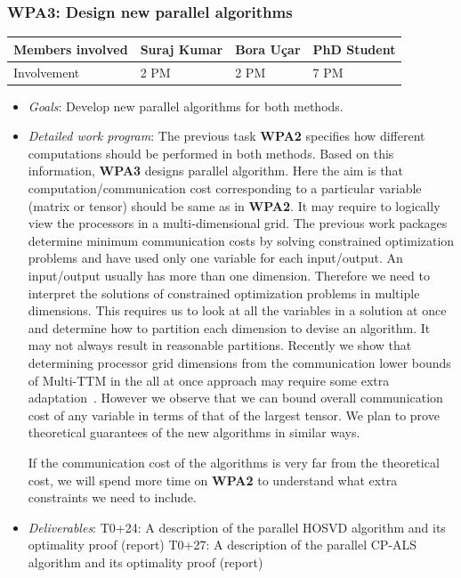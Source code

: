 \documentclass[a4paper,11pt]{article}
\newcommand{\subtask}[1]{{\color{orange}\paragraph{#1}$ $}}
\newcommand{\goal}{{\color{orange2}  \emph{Goals}:} }
\newcommand{\dwp}{{\color{orange2}  \emph{Detailed work program}: }}
\newcommand{\deliverables}{{\color{orange2}  \emph{Deliverables}: }}
\begin{document}
	\subsubsection{\textbf{WPA3}: Design new parallel algorithms}
	\vspace*{-0.375cm}\begin{table}[H]
		\begin{tabular}{llll}
			\hline
			\cellcolor{blue2}
			Members involved & Suraj Kumar& Bora Uçar & PhD Student \\
			\hline
			\cellcolor{orange2}
			Involvement      & 2 PM            & 2 PM & 7 PM \\
			\hline
		\end{tabular}
	\end{table}\vspace*{-0.25cm}
	\begin{itemize}[leftmargin=-1pt]
		\item[] \goal Develop new parallel algorithms for both methods.
		\item[] \dwp The previous task \textbf{WPA2} specifies how different computations should be performed in both methods. Based on this information, \textbf{WPA3} designs parallel algorithm. Here the aim is that computation/communication cost corresponding to a particular variable (matrix or tensor) should be same as in \textbf{WPA2}. It may require to logically view the processors in a multi-dimensional grid. The previous work packages determine minimum communication costs by solving constrained optimization problems and have used only one variable for each input/output. An input/output usually has more than one dimension. Therefore we need to interpret the solutions of constrained optimization problems in multiple dimensions. This requires us to look at all the variables in a solution at once and determine how to partition each dimension to devise an algorithm. It may not always result in reasonable partitions. Recently we show that determining processor grid dimensions from the communication lower bounds of Multi-TTM in the all at once approach may require some extra adaptation~\cite{ABGKR-SIMAX-2024}. However we observe that we can bound overall communication cost of any variable in terms of that of the largest tensor. We plan to prove theoretical guarantees of the new algorithms in similar ways.
		
		If the communication cost of the algorithms is very far from the theoretical cost, we will spend more time on \textbf{WPA2} to understand what extra constraints we need to include. 
		\item[] \deliverables T0+24: A description of the parallel HOSVD algorithm and its optimality proof (report)
		T0+27: A description of the parallel CP-ALS algorithm and its optimality proof (report) 
	\end{itemize}
	
\end{document}
